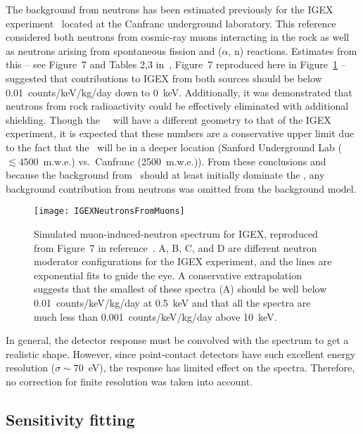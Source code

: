 	The background from neutrons has been estimated previously for the IGEX experiment~\cite{Carmona2004523} located at the Canfranc underground laboratory.  This reference considered both neutrons from cosmic-ray muons interacting in the rock as well as neutrons arising from spontaneous fission and ($\alpha$, n) reactions.  Estimates from this -- see Figure~7 and Tables 2,3 in~\cite{Carmona2004523}, Figure~7 reproduced here in Figure~\ref{fig:IGEXNeutrons} -- suggested that contributions to IGEX from both sources should be below 0.01~counts/keV/kg/day down to 0~keV.  Additionally, it was demonstrated that neutrons from rock radioactivity could be effectively eliminated with additional shielding.  Though the \MJ~\minmod~will have a different geometry to that of the IGEX experiment, it is expected that these numbers are a conservative upper limit due to the fact that the \minmod~will be in a deeper location (Sanford Underground Lab ($\lesssim4500$~m.w.e.) vs.~Canfranc (2500~m.w.e.)).  From these conclusions and because the background from \hthree~should at least initially dominate the \minmod, any background contribution from neutrons was omitted from the background model.
	
			\begin{figure}
				\centering
				\texttt{[image: IGEXNeutronsFromMuons]}
				\caption[Simulated muon-induced-neutron spectrum for IGEX]{Simulated muon-induced-neutron 
				spectrum for IGEX, reproduced from Figure~7 in reference~\cite{Carmona2004523}.  A, B, C, and D are different
				neutron moderator configurations for the IGEX experiment, and the lines are exponential fits to guide the eye.
				A conservative extrapolation suggests that the smallest of these spectra (A) 
				should be well below 0.01~counts/keV/kg/day at
				0.5~keV and that all the spectra are much less than 0.001~counts/keV/kg/day above 10~keV.}
				\label{fig:IGEXNeutrons}
			\end{figure}
	
	In general, the detector response must be convolved with the spectrum to get a realistic shape.  However, since point-contact detectors have such excellent energy resolution ($\sigma\sim70$~eV), the response has limited effect on the spectra.  Therefore, no correction for finite resolution was taken into account.  

		\subsection{Sensitivity fitting}
		\label{sec:MJSensitivityFitting}
	
